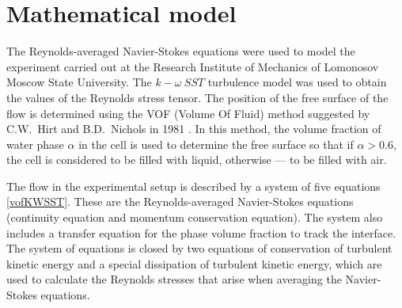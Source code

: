 \documentclass[mathematics,article,submit,pdftex,moreauthors]{Definitions/mdpi}
\begin{document}
\section{Mathematical model}\label{math_model}

The Reynolds-averaged Navier-Stokes equations \cite{Wilcox2006, Hirsch2007,FerzigerPeric2002} were used to model the experiment carried out at the Research Institute of Mechanics of Lomonosov Moscow State University. The $k-\omega\ SST$ turbulence model \cite{Menter1993, Menter1994} was used to obtain the values of the Reynolds stress tensor. The position of the free surface of the flow is determined using the VOF (Volume Of Fluid) method suggested by C.W.~Hirt and B.D.~Nichols in 1981 \cite{HirtNichols1981}. In this method, the volume fraction of water phase $\alpha$ in the cell is used to determine the free surface so that if $\alpha>0.6$, the cell is considered to be filled with liquid, otherwise --- to be filled with air.

The flow in the experimental setup is described by a system of five equations \eqref{vofKWSST}. These are the Reynolds-averaged Navier-Stokes equations (continuity equation and momentum conservation equation). The system also includes a transfer equation for the phase volume fraction to track the interface. The system of equations is closed by two equations of conservation of turbulent kinetic energy and a special dissipation of turbulent kinetic energy, which are used to calculate the Reynolds stresses that arise when averaging the Navier-Stokes equations.
\end{document}
